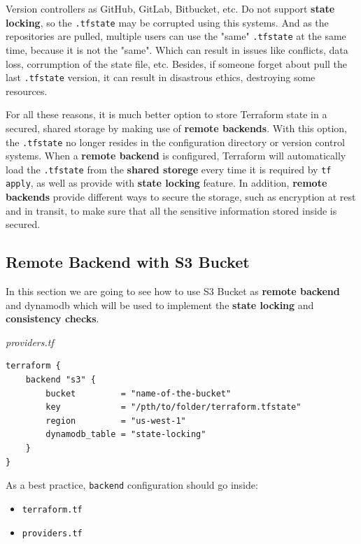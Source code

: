 \documentclass{article}
\newenvironment{blocktemplate}[1]{%
    \tcolorbox[beamer,%
    noparskip,breakable,
    colframe=Blue,%
    colbacklower=LimeGreen!75!LightGreen,%
    title=#1]}%
    {\endtcolorbox}
\newenvironment{codetemplate}[1][]{%
  \mybasecolorbox[#1]
  \itshape
}{%
  \endmybasecolorbox
}
\begin{document}
Version controllers as GitHub, GitLab, Bitbucket, etc. Do not support \textbf{state locking}, so the \verb+.tfstate+ may be corrupted using this systems. And as the repositories are pulled, multiple users can use the "same" \verb+.tfstate+ at the same time, because it is not the "same". Which can result in issues like conflicts, data loss, corrumption of the state file, etc. Besides, if someone forget about pull the last \verb+.tfstate+ version, it can result in disastrous ethics, destroying some resources.

For all these reasons, it is much better option to store Terraform state in a secured, shared storage by making use of \textbf{remote backends}. With this option, the \verb+.tfstate+ no longer resides in the configuration directory or version control systems. When a \textbf{remote backend} is configured, Terraform will automatically load the \verb+.tfstate+ from the \textbf{shared storege} every time it is required by \verb|tf apply|, as well as provide with \textbf{state locking} feature. In addition, \textbf{remote backends} provide different ways to secure the storage, such as encryption at rest and in transit, to make sure that all the sensitive information stored inside is secured.

\subsection{Remote Backend with S3 Bucket}
In this section we are going to see how to use S3 Bucket as \textbf{remote backend} and dynamodb which will be used to implement the \textbf{state locking} and \textbf{consistency checks}.

\begin{codetemplate}{providers.tf}
\begin{verbatim}
terraform {
    backend "s3" {
        bucket         = "name-of-the-bucket"
        key            = "/pth/to/folder/terraform.tfstate"
        region         = "us-west-1"
        dynamodb_table = "state-locking"
    }
}
\end{verbatim}
\end{codetemplate}

\begin{blocktemplate}{Note}
As a best practice, \verb|backend| configuration should go inside:
\begin{itemize}
    \item \verb|terraform.tf|
    \item \verb|providers.tf|
\end{itemize}
\end{blocktemplate}
\end{document}
